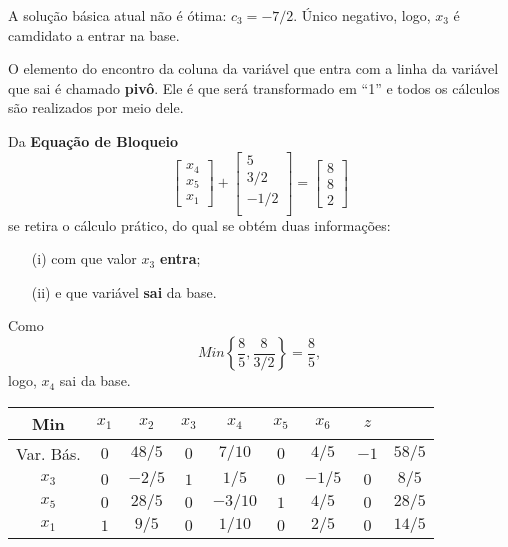 A solução básica atual não é ótima: $ \widehat{c}_3 = -7/2 $.
Único negativo, logo, $ x_3 $ é camdidato a entrar na base.

O elemento do encontro da coluna da variável que entra com a linha da variável 
que sai é chamado \textbf{pivô}.
Ele é que será transformado em ``1'' e todos os cálculos são realizados por meio 
dele.

Da \textbf{Equação de Bloqueio} 
\[
  \begin{bmatrix}
    x_4 \\
    x_5 \\
    x_1
  \end{bmatrix}  
  + \begin{bmatrix}
    5    \\
    3/2  \\
    -1/2 \\
  \end{bmatrix}
  = 
  \begin{bmatrix}
    8 \\
    8 \\
    2
  \end{bmatrix}
\]
se retira o cálculo prático, do qual se obtém duas informações:
\begin{enumerate}
  \item[(i)] com que valor $ x_3 $ \textbf{entra};
  \item[(ii)] e que variável \textbf{sai} da base.
\end{enumerate}

Como
\[
  Min\left\{\frac{8}{5}, \frac{8}{3/2}\right\}  = \frac{8}{5},
\]
logo, $x_4$ sai da base.

\begin{table*}[!htbp]
  \centering
  \begin{tabular}{c|ccccccc|c}
    Min       & $x_1$ & $x_2$  & $x_3$ & $x_4$   & $x_5$ & $x_6$  & $z$  &        \\ \hline
    Var. Bás. & $0$   & $48/5$ & $0$   & $7/10$  & $0$   & $4/5$  & $-1$ & $58/5$ \\ \hline 
    $x_3$     & $0$   & $-2/5$ & $1$   & $1/5$   & $0$   & $-1/5$ & $0$  & $8/5$  \\
    $x_5$     & $0$   & $28/5$ & $0$   & $-3/10$ & $1$   & $4/5$  & $0$  & $28/5$ \\
    $x_1$     & $1$   & $9/5$  & $0$   & $1/10$  & $0$   & $2/5$  & $0$  & $14/5$ 
  \end{tabular}
\end{table*}

